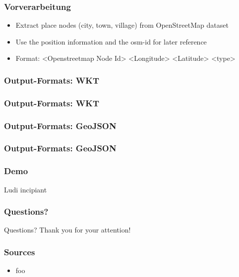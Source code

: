 \documentclass{beamer}
\begin{document}
\begin{frame}
    \frametitle{Vorverarbeitung}
    \begin{itemize}
        \item Extract place nodes (city, town, village) from OpenStreetMap dataset 
        \item Use the position information and the osm-id for later reference
        \item Format: <Openstreetmap Node Id> <Longitude> <Latitude> <type>
    \end{itemize}
\end{frame}

\begin{frame}
    \frametitle{Output-Formats: WKT}
\end{frame}

\begin{frame}
    \frametitle{Output-Formats: WKT}
    
\end{frame}

\begin{frame}
    \frametitle{Output-Formats: GeoJSON}
\end{frame}

\begin{frame}
    \frametitle{Output-Formats: GeoJSON}
    
\end{frame}

\begin{frame}
    \frametitle{Demo}
    \begin{center}
        Ludi incipiant
    \end{center}
\end{frame}

\begin{frame}
    \frametitle{Questions?}
    \begin{center}
    Questions?
    \newline Thank you for your attention!
    \end{center}
\end{frame}

\begin{frame}
    \frametitle{Sources}
    \begin{itemize}
        \item foo
    \end{itemize}
\end{frame}
\end{document}
